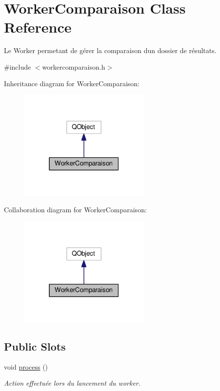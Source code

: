 \hypertarget{classWorkerComparaison}{}\section{Worker\+Comparaison Class Reference}
\label{classWorkerComparaison}


Le Worker permetant de gérer la comparaison d\textquotesingle{}un dossier de résultats.  




{\ttfamily \#include $<$workercomparaison.\+h$>$}



Inheritance diagram for Worker\+Comparaison\+:\nopagebreak
\begin{figure}[H]
\begin{center}
\leavevmode
\includegraphics[width=186pt]{classWorkerComparaison__inherit__graph}
\end{center}
\end{figure}


Collaboration diagram for Worker\+Comparaison\+:\nopagebreak
\begin{figure}[H]
\begin{center}
\leavevmode
\includegraphics[width=186pt]{classWorkerComparaison__coll__graph}
\end{center}
\end{figure}
\subsection*{Public Slots}
\begin{DoxyCompactItemize}
\item 
void \hyperlink{classWorkerComparaison_ac62afd6b36f0c1590e5f3878334a9928}{process} ()
\begin{DoxyCompactList}\small\item\em Action effectuée lors du lancement du worker. \end{DoxyCompactList}\end{DoxyCompactItemize}
